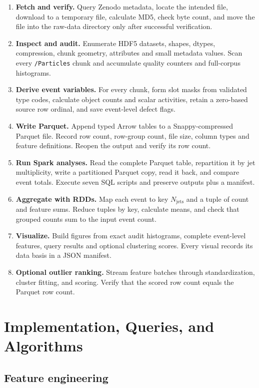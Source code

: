 \documentclass[11pt,a4paper]{article}
\newcommand{\njet}{N_{\mathrm{jets}}}
\begin{document}
\begin{enumerate}
  \item \textbf{Fetch and verify.} Query Zenodo metadata, locate the intended file, download to a temporary file, calculate MD5, check byte count, and move the file into the raw-data directory only after successful verification.
  \item \textbf{Inspect and audit.} Enumerate HDF5 datasets, shapes, dtypes, compression, chunk geometry, attributes and small metadata values. Scan every \texttt{/Particles} chunk and accumulate quality counters and full-corpus histograms.
  \item \textbf{Derive event variables.} For every chunk, form slot masks from validated type codes, calculate object counts and scalar activities, retain a zero-based source row ordinal, and save event-level defect flags.
  \item \textbf{Write Parquet.} Append typed Arrow tables to a Snappy-compressed Parquet file. Record row count, row-group count, file size, column types and feature definitions. Reopen the output and verify its row count.
  \item \textbf{Run Spark analyses.} Read the complete Parquet table, repartition it by jet multiplicity, write a partitioned Parquet copy, read it back, and compare event totals. Execute seven SQL scripts and preserve outputs plus a manifest.
  \item \textbf{Aggregate with RDDs.} Map each event to key \(\njet\) and a tuple of count and feature sums. Reduce tuples by key, calculate means, and check that grouped counts sum to the input event count.
  \item \textbf{Visualize.} Build figures from exact audit histograms, complete event-level features, query results and optional clustering scores. Every visual records its data basis in a JSON manifest.
  \item \textbf{Optional outlier ranking.} Stream feature batches through standardization, cluster fitting, and scoring. Verify that the scored row count equals the Parquet row count.
\end{enumerate}

\section{Implementation, Queries, and Algorithms}

\subsection{Feature engineering}
\end{document}

